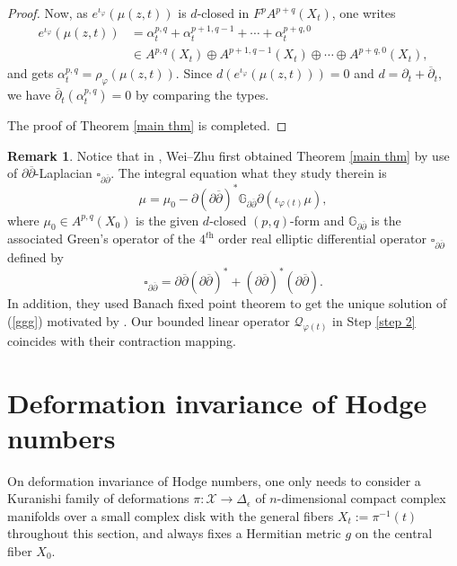 \documentclass[12pt]{amsart}
\numberwithin{equation}{section}
\theoremstyle{definition}
\theoremstyle{definition}
\theoremstyle{definition}
\newtheorem{remark}  [theorem]     {Remark}
\renewcommand{\1}{\mathsf{1}}
\newcommand{\G}{\mathbb{G}}
\renewcommand{\>}{\rightarrow}
\newcommand{\p}{\partial}
\newcommand{\bp}{\overline\partial}
\def\p{\partial}
\theoremstyle{plain} %
\theoremstyle{plain} %
\theoremstyle{plain} %
\begin{document}
\begin{proof}
		Now, as $e^{\iota_\varphi}(\mu(z,t))$ is $d$-closed in $F^{p}A^{p+q}(X_t)$, one writes
		\begin{equation*}\label{decomposition}
			\begin{aligned}
				e^{\iota_\varphi}(\mu(z,t)) &=\alpha_t^{p, q}+\alpha_t^{p+1, q-1}+\cdots+\alpha_t^{p+q, 0} \\
				& \in A^{p, q}\left(X_{t}\right) \oplus A^{p+1, q-1}\left(X_{t}\right) \oplus \cdots \oplus A^{p+q, 0}\left(X_{t}\right),
			\end{aligned}
		\end{equation*}
		and gets $\alpha_t^{p, q}=\rho_\varphi(\mu(z,t)).$ Since $d\left(e^{\iota_\varphi}(\mu(z,t))\right)=0$ and $d=\partial_{t}+\bp_{t}$, we have $\bar{\partial}_{t}\left(\alpha_t^{p, q}\right)=0$ by comparing the types.
		
		The proof of  Theorem   \ref{main thm} is completed.
	\end{proof}
	
	
	
	\begin{remark}
		Notice that in \cite{WZ20},  Wei--Zhu  first obtained Theorem   \ref{main thm}  by use of $\p\bp$-Laplacian $\square_{\p\bp}$. The integral equation what they study  therein is
		\begin{equation}\label{ggg}
			\mu=\mu_0-\p{(\p\bp)}^*\G_{\p\bp}\p(\iota_{\varphi(t)}\mu),
		\end{equation}
		where  $\mu_0\in A^{p,q}(X_0)$ is the given $d$-closed $(p,q)$-form and $\G_{\p\bp}$ is the associated Green's operator of the $4^\textit{th}$ order real elliptic differential operator $\square_{\p\bp}$ defined by
		$$\square_{\p\bp}=\p\bp(\p\bp)^*+(\p\bp)^*(\p\bp).$$ In addition, they used Banach fixed point theorem to get the unique solution of (\ref{ggg}) motivated by \cite{LZ18,LZ20}. Our bounded linear operator $\mathcal{Q}_{\varphi(t)}$ in Step \ref{step 2} coincides with their contraction mapping.
	\end{remark}
	
	
	\section{Deformation invariance of Hodge numbers}
	\label{section 4}
	On deformation invariance of Hodge numbers, one only needs to consider a Kuranishi family of deformations
	$\pi:\mathcal{X}\rightarrow \Delta_{\epsilon}$  of $n$-dimensional compact complex manifolds over a small complex disk
	with the general fibers $X_t:=\pi^{-1}(t)$ throughout this section, and always fixes a Hermitian metric $g$ on the central fiber $X_0$.
	
\end{document}
